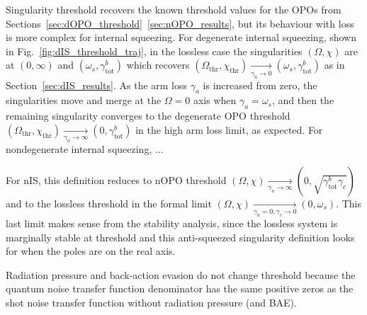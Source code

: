 Singularity threshold recovers the known threshold values for the OPOs from Sections~\ref{sec:dOPO_threshold}~\ref{sec:nOPO_results}, but its behaviour with loss is more complex for internal squeezing. 
For degenerate internal squeezing, shown in Fig.~\ref{fig:dIS_threshold_traj}, in the lossless case the singularities $(\Omega,\chi)$ are at $(0,\infty)$ and $(\omega_s,\gamma^b_\text{tot})$ which recovers $(\Omega_\text{thr},\chi_\text{thr})\xrightarrow[\gamma_a\rightarrow0]{}(\omega_s,\gamma^b_\mathrm{tot})$ as in Section~\ref{sec:dIS_results}. As the arm loss $\gamma_a$ is increased from zero, the singularities move and merge at the $\Omega=0$ axis when $\gamma_a=\omega_s$, and then the remaining singularity converges to the degenerate OPO threshold $(\Omega_\text{thr},\chi_\text{thr})\xrightarrow[\gamma_a\rightarrow\infty]{}(0,\gamma^b_\mathrm{tot})$ in the high arm loss limit, as expected.
For nondegenerate internal squeezing, ...
 


For nIS, this definition reduces to nOPO threshold $(\Omega,\chi)\xrightarrow[\gamma_a\rightarrow\infty]{}(0,\sqrt{\gamma^b_\mathrm{tot}\gamma_c})$ and to the lossless threshold in the formal limit $(\Omega,\chi)\xrightarrow[\gamma_a=0,\gamma_c\rightarrow0]{}(0,\omega_s)$. This last limit makes sense from the stability  analysis, since the lossless system is marginally stable at threshold and this anti-squeezed singularity definition looks for when the poles are on the real axis.

Radiation pressure and back-action evasion do not change threshold because the quantum noise transfer function denominator has the same positive zeros as the shot noise transfer function without radiation pressure (and BAE).












